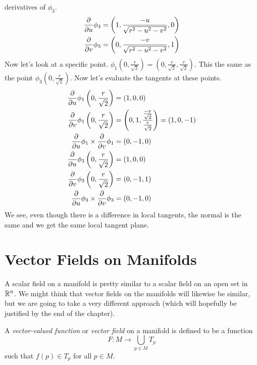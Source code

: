 \documentclass[fleqn,letterpaper]{report}
\begin{document}
\begin{example}
derivatives of $\phi_3$. 
\begin{align*}
\frac{\partial}{\partial u} \phi_3 & =
\left(1,\frac{-u}{\sqrt{r^2-u^2-v^2}}, 0 \right) \\
\frac{\partial}{\partial v} \phi_3 & =
\left(0,\frac{-v}{\sqrt{r^2-u^2-v^2}}, 1 \right) 
\end{align*}
Now let's look at a specific point. $\phi_1 \left( 0,
\frac{r}{\sqrt{2}} \right) = \left( 0, \frac{r}{\sqrt{2}},
\frac{r}{\sqrt{2}} \right)$. This the same as the point
$\phi_3 \left(0, \frac{r}{\sqrt{2}} \right)$. Now let's
evaluate the tangents at these points.
\begin{align*}
\frac{\partial}{\partial u} \phi_1 \left(0, \frac{r}{\sqrt{2}} \right)
& = (1,0,0) \\
\frac{\partial}{\partial v} \phi_1 \left(0, \frac{r}{\sqrt{2}} \right)
& = \left( 0,1,\frac{\frac{-r}{\sqrt{2}}}{\frac{r}{\sqrt{2}}}
\right) = (1,0,-1) \\
\frac{\partial}{\partial u} \phi_1 \times \frac{\partial}{\partial v} \phi_1 &
= (0, -1, 0) \\
\frac{\partial}{\partial u} \phi_3 \left(0, \frac{r}{\sqrt{2}} \right)
& = (1,0,0)
\\
\frac{\partial}{\partial v} \phi_3 \left(0, \frac{r}{\sqrt{2}} \right)
& = (0,-1,1)\\ \frac{\partial}{\partial u} \phi_3 \times
\frac{\partial}{\partial v} \phi_3 & = (0, -1, 0) 
\end{align*}
We see, even though there is a difference in local tangents,
the normal is the same and we get the same local tangent
plane. 
\end{example}

\section{Vector Fields on Manifolds}
\label{manifolds-vector-fields}

A scalar field on a manifold is pretty similar to a scalar
field on an open set in $\mathbb{R}^n$. We might think that vector
fields on the manifolds will likewise be similar, but we are going
to take a very different approach (which will hopefully be
justified by the end of the chapter). 

\begin{defn}
A \emph{vector-valued function} or \emph{vector field} on a
manifold is defined to be a function 
\begin{equation*}
F: M \rightarrow \bigcup_{p \in M} T_p
\end{equation*}
such that $f(p) \in T_p$ for all $p \in M$. 
\end{defn}
\end{document}
